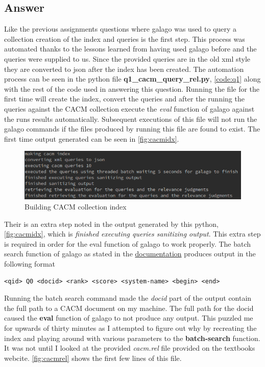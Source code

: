 \documentclass[11pt]{article}
\begin{document}
\subsection{Answer} 
Like the previous assignments questions where galago was used to query a collection creation of the index and queries is the first step. This process was automated thanks to the lessons learned from having used galago before and the queries were supplied to us. Since the provided queries are in the old xml style they are converted to json after the index has been created.  The automation process can be seen in the python file \textbf{q1\_cacm\_query\_rel.py}, \autoref{code:q1} along with the rest of the code used in answering this question. Running the file  for the first time will create the index, convert the queries and after the running the queries against the CACM collection execute the \textit{eval} function of galago against the runs results automatically. Subsequent executions of this file will not run the galago commands if the files produced by running this file are found to exist. The first time output generated can be seen in  \autoref{fig:cacmidx}.
\begin{figure}[H]
\centering
\includegraphics[scale=0.7]{q1buildidx.png}
\caption{Building CACM collection index}
\label{fig:cacmidx}
\end{figure}
Their is an extra step noted in the output generated by this python, \autoref{fig:cacmidx}, which is \textit{finished executing queries sanitizing output}. This extra step is required in order for the eval function of galago to work properly. The batch search function of galago as stated in the \href{https://sourceforge.net/p/lemur/wiki/Galago\%20Functions/}{documentation} produces output in the following format 
\begin{verbatim}
<qid> Q0 <docid> <rank> <score> <system-name> <begin> <end>
\end{verbatim}
Running the batch search command made the \textit{docid} part of the output contain the full path to a CACM document on my machine. The full path for the docid caused the \textbf{eval} function of galago to not produce any output. This puzzled me for upwards of thirty minutes as I attempted to figure out why by recreating the index and playing around with various parameters to the \textbf{batch-search} function. It was not until I looked at the provided \textit{cacm.rel} file provided on the textbooks webcite. \autoref{fig:cacmrel} shows the first few lines of this file.
\end{document}
